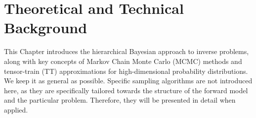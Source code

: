 \chapter{Theoretical and Technical Background}
\label{ch:background}

This Chapter introduces the hierarchical Bayesian approach to inverse problems, along with key concepts of Markov Chain Monte Carlo (MCMC) methods and tensor-train (TT) approximations for high-dimensional probability distributions.
We keep it as general as possible.
Specific sampling algorithms are not introduced here, as they are specifically tailored towards the structure of the forward model and the particular problem. Therefore, they will be presented in detail when applied.


